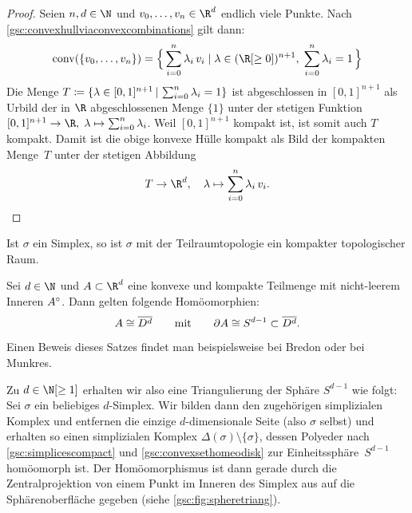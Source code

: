 \begin{proof}
    Seien $n,d\in\N$ und $v_0,\ldots,v_n\in\R^d$ endlich viele Punkte. Nach
    \cref{gsc:convexhullviaconvexcombinations} gilt dann:
    \[ \conv(\{v_0,\ldots,v_n\}) = 
        \Bigl\{\, \isum^n \lambda_i\,v_i \Mid[\;] \lambda\in(\R[\geq0])^{n+1},
        \; \isum^n \lambda_i = 1    \,\Bigr\}
    \]
    Die Menge 
    $T\defeq\{ \lambda\in [0,1]^{n+1} \Mid \isum^n \lambda_i = 1 \}$
    ist abgeschlossen in $[0,1]^{n+1}$ als Urbild der in $\R$ abgeschlossenen
    Menge $\{1\}$ unter der stetigen Funktion $[0,1]^{n+1}\to\R,\;
    \lambda\mapsto\isum^n \lambda_i$. Weil $[0,1]^{n+1}$ kompakt ist, ist somit
    auch $T$ kompakt. Damit ist die obige konvexe Hülle kompakt als Bild der
    kompakten Menge~$T$ unter der stetigen Abbildung
    \[ T \to \R^d, \quad \lambda\mapsto \isum^n \lambda_i\,v_i . \]
\end{proof}

\begin{thKorollar}
    \label{gsc:simplicescompact}
    Ist $\sigma$ ein Simplex, so ist $\sigma$ mit der Teilraumtopologie ein
    kompakter topologischer Raum.
\end{thKorollar}

\begin{thSatz}
    \label{gsc:convexsethomeodisk}
    Sei $d\in\N$ und $A\subset\R^d$ eine konvexe und kompakte Teilmenge mit
    nicht-leerem Inneren $A^\circ$. Dann gelten folgende Homöomorphien:
    \[ A\cong\overline{D^d} \qquad\text{mit}\qquad 
        \partial A \cong S^{d-1} \subset \overline{D^d} . \]
\end{thSatz}

Einen Beweis dieses Satzes findet man beispielsweise bei
Bredon\cite[Ch.\,I,.]{bookc:bredon93} oder bei
Munkres\cite[Ch.\,1,\;\S1,]{bookc:munkres84}.

\begin{thBeispiel}\label{gsc:bsp:spheretriang}
    Zu $d\in\N[\geq1]$ erhalten wir also eine Triangulierung der Sphäre
    $S^{d-1}$ wie folgt: Sei $\sigma$ ein beliebiges $d$-Simplex. Wir bilden
    dann den zugehörigen simplizialen Komplex und entfernen die einzige
    $d$-dimensionale Seite (also $\sigma$ selbst) und erhalten so einen
    simplizialen Komplex $\Delta(\sigma)\setminus\{\sigma\}$, dessen Polyeder
    nach \cref{gsc:simplicescompact} und \cref{gsc:convexsethomeodisk} zur
    Einheitssphäre~$S^{d-1}$ homöomorph ist. Der Homöomorphismus ist dann
    gerade durch die Zentralprojektion von einem Punkt im Inneren des Simplex
    aus auf die Sphärenoberfläche gegeben (siehe \cref{gsc:fig:spheretriang}).
\end{thBeispiel}

